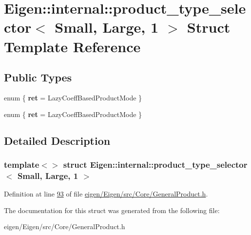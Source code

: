 \hypertarget{struct_eigen_1_1internal_1_1product__type__selector_3_01_small_00_01_large_00_011_01_4}{}\section{Eigen\+:\+:internal\+:\+:product\+\_\+type\+\_\+selector$<$ Small, Large, 1 $>$ Struct Template Reference}
\label{struct_eigen_1_1internal_1_1product__type__selector_3_01_small_00_01_large_00_011_01_4}
\subsection*{Public Types}
\begin{DoxyCompactItemize}
\item 
\mbox{\label{struct_eigen_1_1internal_1_1product__type__selector_3_01_small_00_01_large_00_011_01_4_a3631e94c5d39717765c0448e8e24b0ee}} 
enum \{ {\bfseries ret} = Lazy\+Coeff\+Based\+Product\+Mode
 \}
\item 
\mbox{\label{struct_eigen_1_1internal_1_1product__type__selector_3_01_small_00_01_large_00_011_01_4_a4ec32367f04b7a0bf6930b543ad08645}} 
enum \{ {\bfseries ret} = Lazy\+Coeff\+Based\+Product\+Mode
 \}
\end{DoxyCompactItemize}


\subsection{Detailed Description}
\subsubsection*{template$<$$>$\newline
struct Eigen\+::internal\+::product\+\_\+type\+\_\+selector$<$ Small, Large, 1 $>$}



Definition at line \hyperlink{eigen_2_eigen_2src_2_core_2_general_product_8h_source_l00093}{93} of file \hyperlink{eigen_2_eigen_2src_2_core_2_general_product_8h_source}{eigen/\+Eigen/src/\+Core/\+General\+Product.\+h}.



The documentation for this struct was generated from the following file\+:\begin{DoxyCompactItemize}
\item 
eigen/\+Eigen/src/\+Core/\+General\+Product.\+h\end{DoxyCompactItemize}
